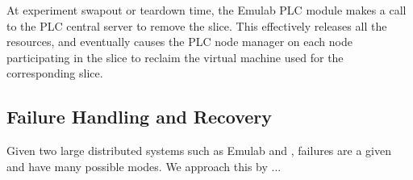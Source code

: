 At experiment swapout or teardown time, the Emulab PLC module makes a
call to the PLC central server to remove the slice.  This effectively
releases all the resources, and eventually causes the PLC node manager
on each node participating in the slice to reclaim the virtual machine
used for the corresponding slice.

\subsection{Failure Handling and Recovery}

Given two large distributed systems such as Emulab and \plab, failures
are a given and have many possible modes.  We approach this by ...
